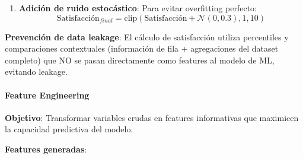 \begin{enumerate}
    Ejemplos de pesos por perfil:
    \begin{itemize}
        \item Familia con ni\~{n}os: $w_{\text{educaci}\acute{\text{o}}\text{n}} = 2.5$, $w_{\text{espacios}} = 2.5$
        \item Profesional joven: $w_{\text{transporte}} = 2.5$, $w_{\text{valor}} = 1.8$
        \item Adulto mayor: $w_{\text{salud}} = 3.0$, $w_{\text{seguridad}} = 2.0$
    \end{itemize}
    
    \item \textbf{Adición de ruido estocástico}: Para evitar overfitting perfecto:
    \begin{equation}
    \text{Satisfacción}_{final} = \text{clip}(\text{Satisfacción} + \mathcal{N}(0, 0.3), 1, 10)
    \end{equation}
\end{enumerate}

\textbf{Prevención de data leakage}: El cálculo de satisfacción utiliza percentiles y comparaciones contextuales (información de fila + agregaciones del dataset completo) que NO se pasan directamente como features al modelo de ML, evitando leakage.

\paragraph{Feature Engineering}

\textbf{Objetivo}: Transformar variables crudas en features informativas que maximicen la capacidad predictiva del modelo.

\textbf{Features generadas}:

